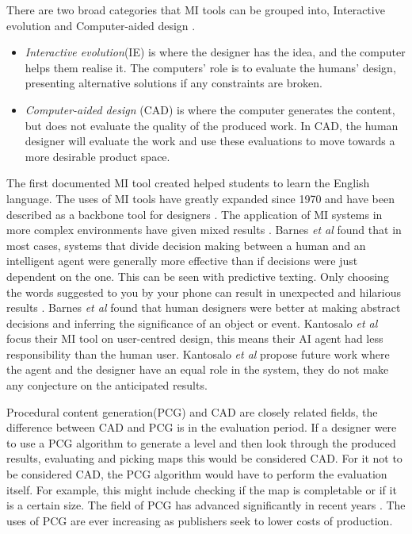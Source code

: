 \documentclass[journal]{IEEEtran}
\begin{document}
There are two broad categories that MI tools can be grouped into, Interactive evolution and Computer-aided design \cite{liapis2016mixed}. 
\begin{itemize}
    \item \textit{Interactive evolution}(IE) is where the designer has the idea, and the computer helps them realise it. The computers' role is to evaluate the humans' design, presenting alternative solutions if any constraints are broken. 
    
    \item \textit{Computer-aided design} (CAD) is where the computer generates the content, but does not evaluate the quality of the produced work. In CAD, the human designer will evaluate the work and use these evaluations to move towards a more desirable product space.
\end{itemize}

The first documented MI tool created helped students to learn the English language\cite{carbonell1970mixed}. The uses of MI tools have greatly expanded since 1970 and have been described as a backbone tool for designers \cite{alvarez2018fostering}. The application of MI systems in more complex environments have given mixed results \cite{barnes2015designing}. Barnes \textit{et al}\cite{barnes2015designing} found that in most cases, systems that divide decision making between a human and an intelligent agent were generally more effective than if decisions were just dependent on the one. This can be seen with predictive texting. Only choosing the words suggested to you by your phone can result in unexpected and hilarious results \cite{quicktype}. Barnes \textit{et al}\cite{barnes2015designing} found that human designers were better at making abstract decisions and inferring the significance of an object or event. Kantosalo \textit{et al}\cite{kantosalo2014isolation} focus their MI tool on user-centred design, this means their AI agent had less responsibility than the human user. Kantosalo \textit{et al}\cite{kantosalo2014isolation} propose future work where the agent and the designer have an equal role in the system, they do not make any conjecture on the anticipated results.

Procedural content generation(PCG) and CAD are closely related fields, the difference between CAD and PCG is in the evaluation period. If a designer were to use a PCG algorithm to generate a level and then look through the produced results, evaluating and picking maps this would be considered CAD\cite{liapis2016mixed}. For it not to be considered CAD, the PCG algorithm would have to perform the evaluation itself. For example, this might include checking if the map is completable or if it is a certain size. The field of PCG has advanced significantly in recent years \cite{van2013designing}. The uses of PCG are ever increasing as publishers seek to lower costs of production\cite{doherty2005mixed, font2016constrained}.
\end{document}
